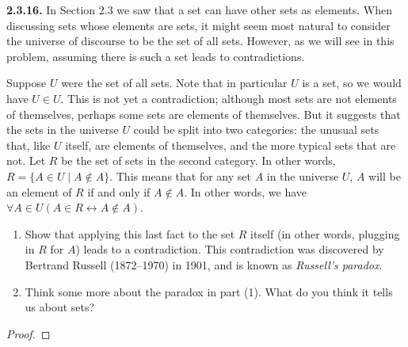 \documentclass[12pt]{amsart}
\newenvironment{statement}[1]{\smallskip\noindent\color[rgb]{.6627, .3529, .6314} {\bf #1.}}{}
\theoremstyle{definition}
\theoremstyle{remark}
\begin{document}
\begin{statement}{2.3.16}
In Section 2.3 we saw that a set can have other sets as elements.
When discussing sets whose elements are sets, it might seem most natural to consider the universe of discourse to be the set of all sets.
However, as we will see in this problem, assuming there is such a set leads to contradictions.

Suppose $U$ were the set of all sets.
Note that in particular $U$ is a set, so we would have $U \in U$.
This is not yet a contradiction;
although most sets are not elements of themselves, perhaps some sets are elements of themselves.
But it suggests that the sets in the universe $U$ could be split into two categories:
the unusual sets that, like $U$ itself, are elements of themselves,
and the more typical sets that are not.
Let $R$ be the set of sets in the second category.
In other words, $R = \{ A \in U \mid A \notin A \}$.
This means that for any set $A$ in the universe $U$,
$A$ will be an element of $R$ if and only if $A \notin A$.
In other words, we have $\forall A \in U (A \in R \leftrightarrow A \notin A)$.
\begin{enumerate}
	\item Show that applying this last fact to the set $R$ itself
	(in other words, plugging in $R$ for $A$) leads to a contradiction.
	This contradiction was discovered by Bertrand Russell (1872--1970) in 1901,
	and is known as \emph{Russell's paradox}.
	
	\item Think some more about the paradox in part (1).
	What do you think it tells us about sets?
\end{enumerate}
\end{statement}

\begin{proof}
\end{proof}
\end{document}
